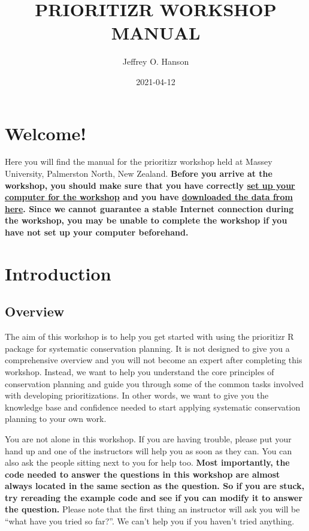 \documentclass[
  12pt,
]{book}
\title{PRIORITIZR WORKSHOP MANUAL}
\author{Jeffrey O. Hanson}
\date{2021-04-12}
\begin{document}
\maketitle

{
\hypersetup{linkcolor=}
\setcounter{tocdepth}{0}
\tableofcontents
}
\hypertarget{welcome}{%
\chapter{Welcome!}\label{welcome}}

Here you will find the manual for the prioritizr workshop held at Massey University, Palmerston North, New Zealand. \textbf{Before you arrive at the workshop, you should make sure that you have correctly \protect\hyperlink{setup}{set up your computer for the workshop} and you have \href{https://github.com/prioritizr/massey-workshop/raw/master/data.zip}{downloaded the data from here}. Since we cannot guarantee a stable Internet connection during the workshop, you may be unable to complete the workshop if you have not set up your computer beforehand.}

\hypertarget{introduction}{%
\chapter{Introduction}\label{introduction}}

\hypertarget{overview}{%
\section{Overview}\label{overview}}

The aim of this workshop is to help you get started with using the prioritizr R package for systematic conservation planning. It is not designed to give you a comprehensive overview and you will not become an expert after completing this workshop. Instead, we want to help you understand the core principles of conservation planning and guide you through some of the common tasks involved with developing prioritizations. In other words, we want to give you the knowledge base and confidence needed to start applying systematic conservation planning to your own work.

You are not alone in this workshop. If you are having trouble, please put your hand up and one of the instructors will help you as soon as they can. You can also ask the people sitting next to you for help too. \textbf{Most importantly, the code needed to answer the questions in this workshop are almost always located in the same section as the question. So if you are stuck, try rereading the example code and see if you can modify it to answer the question.} Please note that the first thing an instructor will ask you will be ``what have you tried so far?''. We can't help you if you haven't tried anything.
\end{document}
